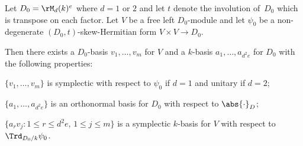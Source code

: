 \begin{lemma} \label{D0-basis}
Let $D_0 = \rM_d(k)^e$ where $d = 1$ or $2$ and let $t$ denote the involution of~$D_0$ which is transpose on each factor.
Let $V$ be a free left $D_0$-module and let $\psi_0$ be a non-degenerate $(D_0,t)$-skew-Hermitian form $V \times V \to D_0$.

Then there exists a $D_0$-basis $v_1, \dotsc, v_m$ for $V$ and a $k$-basis $a_1, \dotsc, a_{d^2e}$ for $D_0$ with the following properties:
\begin{enumeratei}
\item\label{D0-basisi} $\{ v_1, \dotsc, v_m \}$ is symplectic with respect to $\psi_0$ if $d=1$ and unitary if $d=2$;
\item\label{D0-basisii} $\{ a_1, \dotsc, a_{d^2e} \}$ is an orthonormal basis for $D_0$ with respect to $\abs{\cdot}_D$;
\item\label{D0-basisiii} $\{ a_r v_j : 1 \leq r \leq d^2e,\, 1 \leq j \leq m \}$ is a symplectic $k$-basis for $V$ with respect to $\Trd_{D_0/k} \psi_0$.
\end{enumeratei}
\end{lemma}

